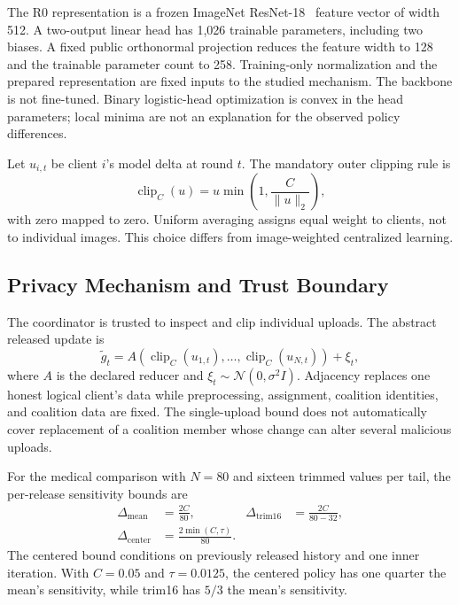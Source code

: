 \documentclass[conference,letterpaper]{IEEEtran}
\newcommand{\clip}{\operatorname{clip}}
\begin{document}
The R0 representation is a frozen ImageNet ResNet-18~\cite{resnet} feature vector of width 512. A two-output linear head has 1,026 trainable parameters, including two biases. A fixed public orthonormal projection reduces the feature width to 128 and the trainable parameter count to 258. Training-only normalization and the prepared representation are fixed inputs to the studied mechanism. The backbone is not fine-tuned. Binary logistic-head optimization is convex in the head parameters; local minima are not an explanation for the observed policy differences.

Let $u_{i,t}$ be client $i$'s model delta at round $t$. The mandatory outer clipping rule is
\begin{equation}
\clip_C(u)=u\min\left(1,\frac{C}{\lVert u\rVert_2}\right),
\label{eq:clip}
\end{equation}
with zero mapped to zero. Uniform averaging assigns equal weight to clients, not to individual images. This choice differs from image-weighted centralized learning.

\subsection{Privacy Mechanism and Trust Boundary}
The coordinator is trusted to inspect and clip individual uploads. The abstract released update is
\begin{equation}
\widetilde{g}_t=A(\clip_C(u_{1,t}),\ldots,\clip_C(u_{N,t}))+\xi_t,
\end{equation}
where $A$ is the declared reducer and $\xi_t\sim\mathcal{N}(0,\sigma^2I)$. Adjacency replaces one honest logical client's data while preprocessing, assignment, coalition identities, and coalition data are fixed. The single-upload bound does not automatically cover replacement of a coalition member whose change can alter several malicious uploads.

For the medical comparison with $N=80$ and sixteen trimmed values per tail, the per-release sensitivity bounds are
\begin{align}
\Delta_{\mathrm{mean}}&=\frac{2C}{80}, &
\Delta_{\mathrm{trim16}}&=\frac{2C}{80-32},\\
\Delta_{\mathrm{center}}&=\frac{2\min(C,\tau)}{80}.
\label{eq:sensitivity}
\end{align}
The centered bound conditions on previously released history and one inner iteration. With $C=0.05$ and $\tau=0.0125$, the centered policy has one quarter the mean's sensitivity, while trim16 has $5/3$ the mean's sensitivity.
\end{document}
